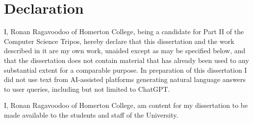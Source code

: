 \documentclass[final,rdr32.tex]{subfiles}
\begin{document}
\clearpage
\section*{Declaration}

I, Ronan Ragavoodoo of Homerton College, being a candidate for Part II of the Computer Science Tripos, hereby declare that this dissertation and the work described in it are my own work, unaided except as may be specified below, and that the dissertation does not contain material that has already been used to any substantial extent for a comparable purpose. In preparation of this dissertation I did not use text from AI-assisted platforms generating natural language answers to user queries, including but not limited to ChatGPT.
\bigskip

\noindent I, Ronan Ragavoodoo of Homerton College, am content for my dissertation to be made
available to the students and staff of the University.

\bigskip


\par\noindent{} \hfill\makebox[2.0in]{\today}%
\vspace{-12pt}
\par\noindent\makebox[2.5in]{\hrulefill} \hfill\makebox[2.0in]{\hrulefill}%
\par\noindent{}      \hfill{}%
\end{document}

